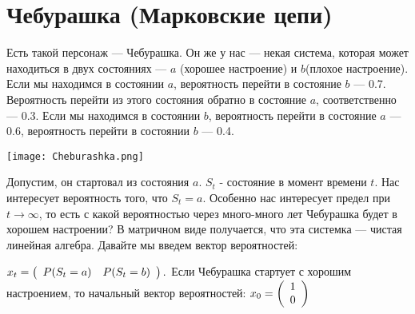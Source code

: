 \section {Чебурашка (Марковские цепи)}

Есть такой персонаж --- Чебурашка. Он же у нас --- некая система, которая может находиться в двух состояниях --- $a$ (хорошее настроение) и $b$(плохое настроение). Если мы находимся в состоянии $a$, вероятность перейти в состояние $b$ --- 0.7. Вероятность перейти из этого состояния обратно в состояние $a$, соответственно --- 0.3. Если мы находимся в состоянии $b$, вероятность перейти в состояние $a$ --- 0.6, вероятность перейти в состоянии $b$ ---  0.4.

\texttt{[image:  Cheburashka.png]}

Допустим, он стартовал из состояния $a$. $S_t$ - состояние в момент времени $t$. 
Нас интересует вероятность того, что $S_t=a$. 
Особенно нас интересует предел при $t\to \infty$, то есть с какой вероятностью через много-много лет Чебурашка будет в хорошем настроении?
В матричном виде получается, что эта системка --- чистая линейная алгебра. Давайте мы введем вектор вероятностей:

$x_t = \left( \begin{array}{ll}
		P(S_t=a) & P(S_t=b) \\
		\end{array} \right).\\	$
Если Чебурашка стартует с хорошим настроением, то начальный вектор вероятностей:
$x_0= \left( \begin{array}{l}
		1 \\ 
		0\\
		\end{array} \right)\\  $
				
